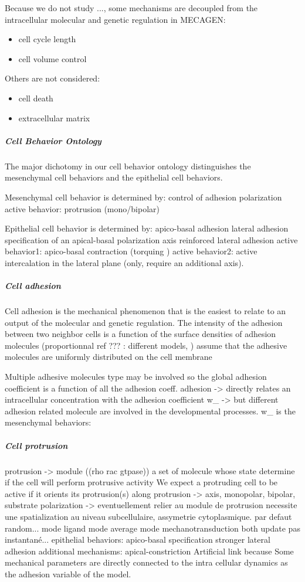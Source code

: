   Because we do not study ..., some mechanisms are decoupled from the intracellular molecular and genetic regulation in MECAGEN: 
\begin{itemize}
	\item cell cycle length
	\item cell volume control
\end{itemize}

  Others are not considered: 
\begin{itemize}
	\item cell death
	\item extracellular matrix
\end{itemize}

\subparagraph{Cell Behavior Ontology}

   The major dichotomy in our cell behavior ontology distinguishes the mesenchymal cell behaviors and the epithelial cell behaviors.  

   Mesenchymal cell behavior is determined by:     control of adhesion    polarization    active behavior: protrusion (mono/bipolar)    

   Epithelial cell behavior is determined by:      apico-basal adhesion  lateral adhesion  specification of an apical-basal polarization axis  reinforced lateral adhesion  active behavior1: apico-basal contraction (torquing )  active behavior2: active intercalation in the lateral plane (only, require an additional axis).  

\subparagraph{Cell adhesion}

  Cell adhesion is the mechanical phenomenon that is the easiest to relate to an output of the molecular and genetic regulation. The intensity of the adhesion between two neighbor cells is a function of the surface densities of adhesion molecules (proportionnal ref ??? \cite{Zhang:2011ca}: different models, )  assume that the adhesive molecules are uniformly distributed on the cell membrane 

  Multiple adhesive molecules type may be involved so the global adhesion coefficient is a function of all the adhesion coeff.    adhesion -> directly relates an intracellular concentration with the adhesion coefficient w_{} -> but different adhesion related molecule are involved in the developmental processes. w_{} is the     mesenchymal behaviors:  

\subparagraph{Cell protrusion}  protrusion -> module ((rho rac gtpase)) a set of molecule whose state determine if the cell will perform protrusive activity  We expect a protruding cell to be active if it orients its protrusion(s) along   protrusion -> axis, monopolar, bipolar, substrate     polarization -> eventuellement relier au module de protrusion  necessite une spatialization au niveau subcellulaire, assymetrie cytoplasmique.    par defaut random...   mode ligand mode average mode mechanotransduction both  update pas instantané...    epithelial behaviors:  apico-basal specification  stronger lateral adhesion  additional mechanisms: apical-constriction             Artificial link because   Some mechanical parameters are directly connected to the intra cellular dynamics as the adhesion variable of the model.     


